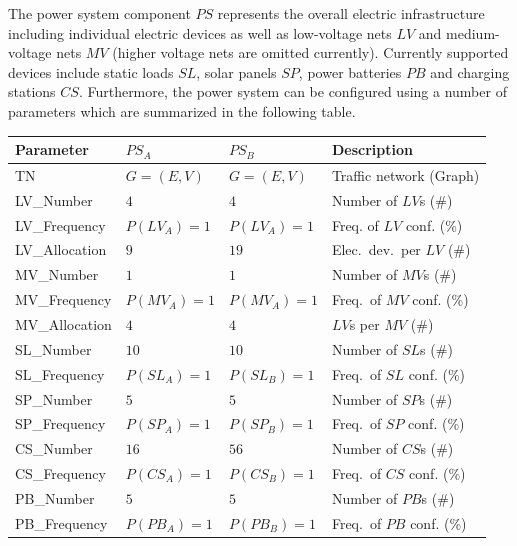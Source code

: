 The power system component $PS$ represents the overall electric infrastructure including individual electric devices as well as low-voltage nets $LV$ and medium-voltage nets $MV$ (higher voltage nets are omitted currently). Currently supported devices include static loads $SL$, solar panels $SP$, power batteries $PB$ and charging stations $CS$. Furthermore, the power system can be configured using a number of parameters which are summarized in the following table.

\begin{table}[h]
	\renewcommand{\arraystretch}{1.3}
	\centering
	\begin{tabularx}{\columnwidth}{lllX}
		\hline
		\textbf{Parameter}     & \textbf{$PS_{A}$} & \textbf{$PS_{B}$}       & \textbf{Description} \\ \hline
		TN              	   & $G=(E,V)$ & $G=(E,V)$    	  & Traffic network (Graph)     \\
		LV\_Number             & $4$ & $4$            & Number of $LV$s (\#)      \\
		LV\_Frequency          & $P(LV_{A})=1$ & $P(LV_{A})=1$                & Freq. of $LV$ conf. (\%)      \\
		LV\_Allocation         & $9$ & $19$                 & Elec.\ dev.\ per $LV$ (\#)      \\   
		MV\_Number             & $1$ & $1$        & Number of $MV$s (\#)      \\ 
		MV\_Frequency          & $P(MV_{A})=1$ & $P(MV_{A})=1$                & Freq.\ of $MV$ conf. (\%)      \\
		MV\_Allocation         & $4$ & $4$                     & $LV$s per $MV$ (\#)      \\   
		SL\_Number             & $10$ & $10$              & Number of $SL$s (\#)      \\
		SL\_Frequency          & $P(SL_{A})=1$ & $P(SL_{B})=1$              & Freq.\ of $SL$ conf. (\%)       \\
		SP\_Number             & $5$ & $5$         & Number of $SP$s (\#)      \\ 
		SP\_Frequency          & $P(SP_{A})=1$ & $P(SP_{B})=1$                & Freq.\ of $SP$ conf. (\%)       \\  
		CS\_Number             & $16$  & $56$           & Number of $CS$s (\#)      \\
		CS\_Frequency          & $P(CS_{A})=1$  & $P(CS_{B})=1$               & Freq.\ of $CS$ conf. (\%)       \\   
		PB\_Number             & $5$  & $5$              & Number of $PB$s (\#)      \\
		PB\_Frequency          & $P(PB_{A})=1$ & $P(PB_{B})=1$              & Freq.\ of $PB$ conf. (\%)       \\   \hline  
	\end{tabularx}
\end{table}

